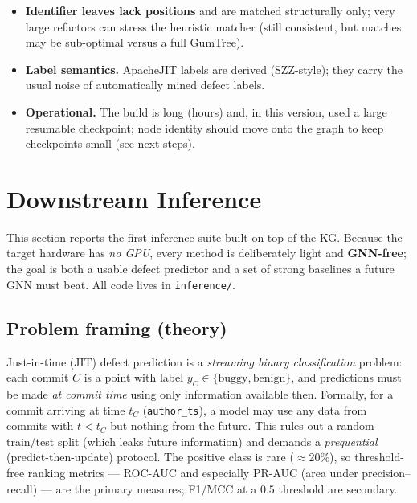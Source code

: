 \documentclass[11pt,a4paper]{article}
\newcommand{\code}[1]{\texttt{#1}}
\begin{document}
\begin{itemize}[nosep]
		\item \textbf{Identifier leaves lack positions} and are matched structurally
		only; very large refactors can stress the heuristic matcher (still
		consistent, but matches may be sub-optimal versus a full GumTree).
		\item \textbf{Label semantics.} ApacheJIT labels are derived (SZZ-style); they
		carry the usual noise of automatically mined defect labels.
		\item \textbf{Operational.} The build is long (hours) and, in this version,
		used a large resumable checkpoint; node identity should move onto the
		graph to keep checkpoints small (see next steps).
	\end{itemize}
	
	\section{Downstream Inference}\label{sec:inference}
	This section reports the first inference suite built on top of the KG. Because
	the target hardware has \emph{no GPU}, every method is deliberately light and
	\textbf{GNN-free}; the goal is both a usable defect predictor and a set of strong
	baselines a future GNN must beat. All code lives in \texttt{inference/}.
	
	\subsection{Problem framing (theory)}
	Just-in-time (JIT) defect prediction is a \emph{streaming binary
		classification} problem: each commit $C$ is a point with label
	$y_C\in\{\text{buggy},\text{benign}\}$, and predictions must be made
	\emph{at commit time} using only information available then. Formally, for a
	commit arriving at time $t_C$ (\code{author\_ts}), a model may use any data from
	commits with $t<t_C$ but nothing from the future. This rules out a random
	train/test split (which leaks future information) and demands a
	\emph{prequential} (predict-then-update) protocol. The positive class is rare
	($\approx$20\%), so threshold-free ranking metrics --- ROC-AUC and especially
	PR-AUC (area under precision--recall) --- are the primary measures; F1/MCC at a
	$0.5$ threshold are secondary.
	
\end{document}
